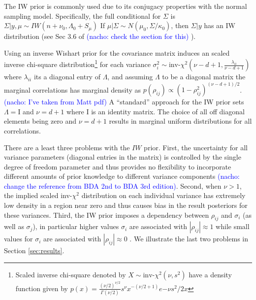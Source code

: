 \documentclass[a4paper]{article}
\newcommand{\nacho}[1]{\textcolor{blue}{(nacho: #1)}}
\newcommand{\I}{\mathrm{I}}
\begin{document}
The IW prior is commonly used due to its conjugacy properties with the normal sampling model. Specifically, the full conditional for $\Sigma$ is $\Sigma \vert y,\mu \sim IW(n+\nu_0, \Lambda_0+S_\mu)$ If $\mu|\Sigma \sim N(\mu_0,\Sigma/\kappa_0)$, then $\Sigma|y$ has an IW distribution (see Sec 3.6 of \cite{bda2013} \nacho{check the section for this} ). 

Using an inverse Wishart prior for the covariance matrix induces an scaled inverse chi-square distribution\footnote{Scaled inverse chi-square denoted by $X \sim \mbox{inv-}\chi^2(\nu, s^2)$ have a density function given by $p(x) =  \frac{(\nu/2)^{\nu/2}} {\Gamma(\nu/2)} s^{\nu}x^{-(\nu/2 + 1)} e{-\nu s^2 / 2x} $} for each variance $\sigma_i^2\sim \mbox{inv-}\chi^2(\nu - d + 1, \frac{\lambda_{ii}}{\nu-d+1} )$ where $\lambda_{ii}$ its a diagonal entry of $\Lambda$, and assuming $\Lambda$ to be a diagonal matrix the marginal correlations has marginal density as $p(\rho_{ij}) \propto (1 - \rho_{ij}^2)^{(\nu - d + 1)/2}$. \nacho{I've taken from Matt pdf} A ``standard'' approach for the IW prior sets $\Lambda=\I$ and $\nu=d+1$ where $\I$ is an identity matrix. The choice of all off diagonal elements being zero and $\nu=d+1$ results in marginal uniform distributions for all correlations.

There are a least three problems with the $IW$ prior. First, the uncertainty for all variance parameters (diagonal entries in the matrix) is controlled by the single degree of freedom parameter and thus provides no flexibility to incorporate different amounts of prior knowledge to different variance components \citep{bda2013} \nacho{change the reference from BDA 2nd to BDA 3rd edition}. Second, when $\nu>1$, the implied scaled inv-$\chi^2$ distribution on each individual variance has extremely low density in a region near zero and thus causes bias in the result posteriors for these variances. Third, the IW prior imposes a dependency between $\rho_{ij}$ and $\sigma_i$ (as well as $\sigma_j$), in particular higher values $\sigma_i$ are associated with $|\rho_{ij}|\approx 1$ while small values for $\sigma_i$ are associated with $|\rho_{ij}|\approx 0$ \citep{visualize}.  We illustrate the last two problems in Section \ref{sec:results}.

\end{document}
